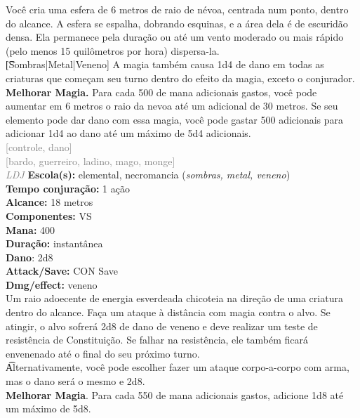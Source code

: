 \documentclass{RPG_Adventure}[2021/10/20]
\begin{document}
{\normalsize Você cria uma esfera de 6 metros de raio de névoa, centrada num ponto, dentro do alcance. A esfera se espalha, dobrando esquinas, e a área dela é de escuridão densa. Ela permanece pela duração ou até um vento moderado ou mais rápido (pelo menos 15 quilômetros por hora) dispersa-la.\\\t [Sombras|Metal|Veneno] A magia também causa 1d4 de dano em todas as criaturas que começam seu turno dentro do efeito da magia, exceto o conjurador.\\\t \textbf{Melhorar Magia.} Para cada 500 de mana adicionais gastos, você pode aumentar em 6 metros o raio da nevoa até um adicional de 30 metros. Se seu elemento pode dar dano com essa magia, você pode gastar 500 adicionais para adicionar 1d4 ao dano até um máximo de 5d4 adicionais.\\}
{\scriptsize \textcolor{gray}{[controle, dano]\\}}
{\scriptsize \textcolor{gray}{[bardo, guerreiro, ladino, mago, monge]\\}}
{\tiny \textcolor{gray}{\textit{LDJ}}}\jump{}
{\small \t \textbf{Escola(s):} elemental, necromancia (\textit{sombras, metal, veneno})\\\t \textbf{Tempo conjuração:} 1 ação\\\t \textbf{Alcance:} 18 metros\\\t \textbf{Componentes:} VS\\\t \textbf{Mana:} 400\\\t \textbf{Duração:} instantânea\\\t \textbf{Dano}: 2d8\\\t \textbf{Attack/Save:} CON Save\\\t \textbf{Dmg/effect:} veneno\\}
{\normalsize Um raio adoecente de energia esverdeada chicoteia na direção de uma criatura dentro do alcance. Faça um ataque à distância com magia contra o alvo. Se atingir, o alvo sofrerá 2d8 de dano de veneno e deve realizar um teste de resistência de Constituição. Se falhar na resistência, ele também ficará envenenado até o final do seu próximo turno.\\\t Alternativamente, você pode escolher fazer um ataque corpo-a-corpo com arma, mas o dano será o mesmo e 2d8.\\\t \textbf{Melhorar Magia}. Para cada 550 de mana adicionais gastos, adicione 1d8 até um máximo de 5d8.\\}
\end{document}
